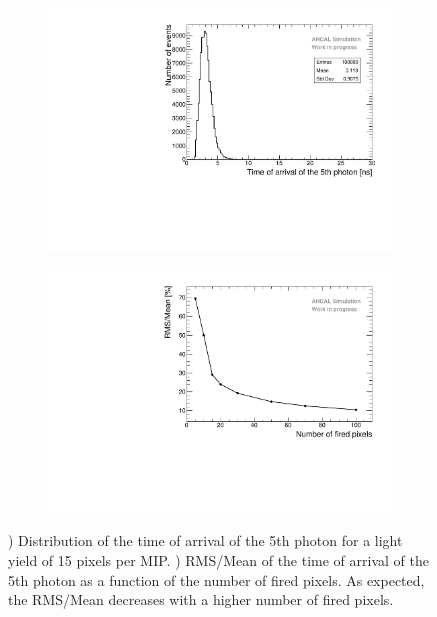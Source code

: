 \begin{figure}[htbp!]
	\begin{subfigure}[t]{0.5\textwidth}
		\centering
		\includegraphics[width=1\textwidth]{../Thesis_Plots/Timing/Muons/Plots/TimeArrival5thPhoton_MCToy.pdf}
		\caption{}\label{fig:time_arrival5th}
	\end{subfigure}
	\hfill
	\begin{subfigure}[t]{0.5\textwidth}
		\centering
		\includegraphics[width=1\textwidth]{../Thesis_Plots/Timing/Muons/Plots/TimeArrival5thPhoton_MCToy_Npe.pdf}
		\caption{}\label{fig:time_arrival5th_LY}
	\end{subfigure}
	\caption{) Distribution of the time of arrival of the 5th photon for a light yield of 15 pixels per MIP. ) RMS/Mean of the time of arrival of the 5th photon as a function of the number of fired pixels. As expected, the RMS/Mean decreases with a higher number of fired pixels.}
\end{figure}

